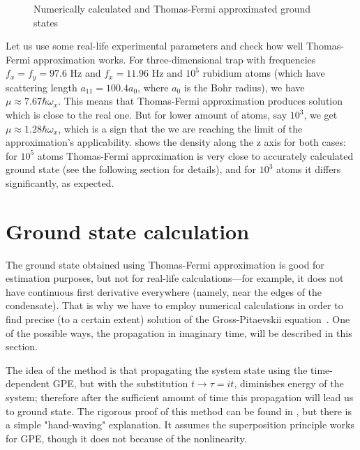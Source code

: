\begin{figure}
\begin{center}
\end{center}
\caption{Numerically calculated and Thomas-Fermi approximated ground states}
\label{fig:mean-field:tf-vs-accurate}
\end{figure}

Let us use some real-life experimental parameters and check how well Thomas-Fermi approximation works.
For three-dimensional trap with frequencies $f_x = f_y = 97.6 \textrm{ Hz}$ and $f_x = 11.96 \textrm{ Hz}$
and $10^5$ rubidium atoms (which have scattering length $a_{11} = 100.4 a_0$, where $a_0$ is the Bohr radius),
we have $\mu \approx 7.67 \hbar \omega_x$.
This means that Thomas-Fermi approximation produces solution which is close to the real one.
But for lower amount of atoms, say $10^3$, we get $\mu \approx 1.28 \hbar \omega_x$,
which is a sign that the we are reaching the limit of the approximation's applicability.
 shows the density along the z axis for both cases:
for $10^5$ atoms Thomas-Fermi approximation is very close to accurately calculated ground state (see the following section for details),
and for $10^3$ atoms it differs significantly, as expected.


\section{Ground state calculation}

The ground state obtained using Thomas-Fermi approximation is good for estimation purposes,
but not for real-life calculations---for example, it does not have continuous first derivative everywhere
(namely, near the edges of the condensate).
That is why we have to employ numerical calculations in order to find precise (to a certain extent) solution
of the Gross-Pitaevskii equation~.
One of the possible ways, the propagation in imaginary time, will be described in this section.

The idea of the method is that propagating the system state using the time-dependent GPE,
but with the substitution $t \rightarrow \tau = it$, diminishes energy of the system;
therefore after the sufficient amount of time this propagation will lead us to ground state.
The rigorous proof of this method can be found in \cite{Bao2004}, but there is a simple "hand-waving" explanation.
It assumes the superposition principle works for GPE, though it does not because of the nonlinearity.

